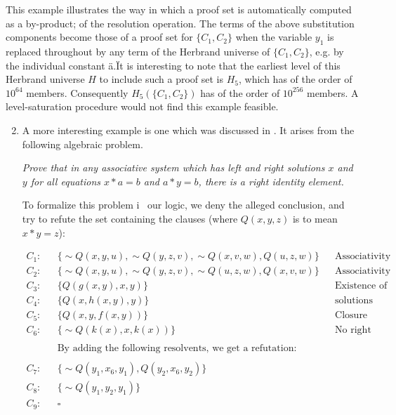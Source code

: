 \documentclass[8pt]{extarticle}
\begin{document}
\newpage

This example illustrates the way in which a proof set is automatically computed as a by-product; of the resolution operation. The terms of the above substitution components become those of a proof set for $\{C_1 , C_2\}$ when the variable $y_1$ is replaced throughout by any term of the Herbrand universe of $\{C_1, C_2\}$, e.g. by the individual constant \"a.\" It is interesting to note that the earliest level of this Herbrand universe $H$ to include such a proof set is $H_5$, which has of the order of $10^64$ members. Consequently $H_5(\{C_1, C_2\})$ has of the order of $10^256$ members. A level-saturation procedure would not find this example feasible.

\begin{enumerate}[label=Example \arabic*.]
    \setcounter{enumi}{1}
    \item A more interesting example is one which was discussed in \cite{robinson_1963}. It arises from the following algebraic problem.
    
    \emph{Prove that in any associative system which has left and right solutions $x$ and $y$ for all equations $x*a = b$ and $a * y = b$, there is a right identity element.}
    
    To formalize this problem i~ our logic, we deny the alleged conclusion, and try to refute the set containing the clauses (where $Q(x,y,z)$ is to mean $x*y = z$):
    
    \begin{align*}
        C_1 : && \{\sim Q(x,y,u), \sim Q(y,z,v), \sim Q(x,v,w), Q(u,z,w)\} && \text{Associativity} \\
        C_2 : && \{\sim Q(x,y,u), \sim Q(y,z,v), \sim Q(u,z,w), Q(x,v,w)\} && \text{Associativity} \\
        C_3 : && \{Q(g(x,y),x,y)\} && \text{Existence of left and right} \\
        C_4 : && \{Q(x, h(x,y), y)\} && \text{solutions} \\
        C_5 : && \{Q(x,y, f(x,y))\} && \text{Closure under *} \\
        C_6 : && \{\sim Q(k(x), x, k(x))\} && \text{No right identity.} \\ \\
        && \text{By adding the following resolvents, we get a refutation:} && \\ \\
        C_7 : && \{\sim Q(y_1, x_6, y_1), Q(y_2, x_6, y_2)\} && \\
        C_8 : && \{\sim Q(y_1, y_2, y_1)\} && \\
        C_9 : && \square &&
    \end{align*}
\end{enumerate}
\end{document}
